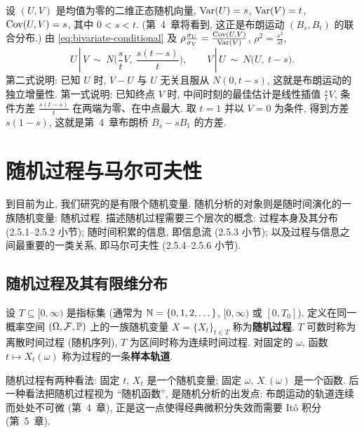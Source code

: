 \begin{example}[布朗桥的雏形]\label{ex:bridge-preview}
设 $(U,V)$ 是均值为零的二维正态随机向量, $\Var(U)=s$, $\Var(V)=t$, $\Cov(U,V)=s$, 其中 $0<s<t$. (第~4~章将看到, 这正是布朗运动 $(B_s,B_t)$ 的联合分布.) 由 \eqref{eq:bivariate-conditional} 及 $\rho\frac{\sigma_U}{\sigma_V}=\frac{\Cov(U,V)}{\Var(V)}$, $\rho^2=\frac{s^2}{st}$,
\[
U\,|\,V\ \sim\ N\Big(\frac{s}{t}V,\ \frac{s(t-s)}{t}\Big),\qquad V\,|\,U\ \sim\ N\big(U,\ t-s\big).
\]
第二式说明: 已知 $U$ 时, $V-U$ 与 $U$ 无关且服从 $N(0,t-s)$, 这就是布朗运动的独立增量性. 第一式说明: 已知终点 $V$ 时, 中间时刻的最佳估计是线性插值 $\frac{s}{t}V$, 条件方差 $\frac{s(t-s)}{t}$ 在两端为零、在中点最大. 取 $t=1$ 并以 $V=0$ 为条件, 得到方差 $s(1-s)$, 这就是第~4~章布朗桥 $B_s-sB_1$ 的方差.
\end{example}

\section{随机过程与马尔可夫性}
\label{sec:2-5}

到目前为止, 我们研究的是有限个随机变量. 随机分析的对象则是随时间演化的一族随机变量: 随机过程. 描述随机过程需要三个层次的概念: 过程本身及其分布 (2.5.1--2.5.2 小节); 随时间积累的信息, 即信息流 (2.5.3 小节); 以及过程与信息之间最重要的一类关系, 即马尔可夫性 (2.5.4--2.5.6 小节).

\subsection{随机过程及其有限维分布}

\begin{definition}[随机过程]\label{def:process}
设 $T\subseteq[0,\infty)$ 是指标集 (通常为 $\N=\{0,1,2,\dots\}$, $[0,\infty)$ 或 $[0,T_0]$). 定义在同一概率空间 $(\Omega,\mathcal{F},\P)$ 上的一族随机变量 $X=\{X_t\}_{t\in T}$ 称为\textbf{随机过程}. $T$ 可数时称为离散时间过程 (随机序列), $T$ 为区间时称为连续时间过程. 对固定的 $\omega$, 函数 $t\mapsto X_t(\omega)$ 称为过程的一条\textbf{样本轨道}.
\end{definition}

随机过程有两种看法: 固定 $t$, $X_t$ 是一个随机变量; 固定 $\omega$, $X_\cdot(\omega)$ 是一个函数. 后一种看法把随机过程视为 ``随机函数'', 是随机分析的出发点: 布朗运动的轨道连续而处处不可微 (第~4~章), 正是这一点使得经典微积分失效而需要 Itô 积分 (第~5~章).

